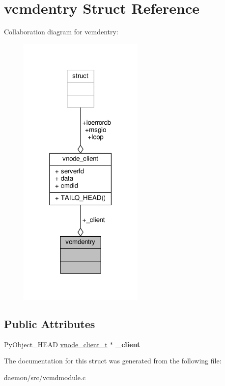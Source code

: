 \hypertarget{structvcmdentry}{\section{vcmdentry Struct Reference}
\label{structvcmdentry}
}


Collaboration diagram for vcmdentry\+:
\nopagebreak
\begin{figure}[H]
\begin{center}
\leavevmode
\includegraphics[width=174pt]{structvcmdentry__coll__graph}
\end{center}
\end{figure}
\subsection*{Public Attributes}
\begin{DoxyCompactItemize}
\item 
\hypertarget{structvcmdentry_ab458e0f89de375351eb421353ead122d}{Py\+Object\+\_\+\+H\+E\+A\+D \hyperlink{structvnode__client}{vnode\+\_\+client\+\_\+t} $\ast$ {\bfseries \+\_\+client}}\label{structvcmdentry_ab458e0f89de375351eb421353ead122d}

\end{DoxyCompactItemize}


The documentation for this struct was generated from the following file\+:\begin{DoxyCompactItemize}
\item 
daemon/src/vcmdmodule.\+c\end{DoxyCompactItemize}
